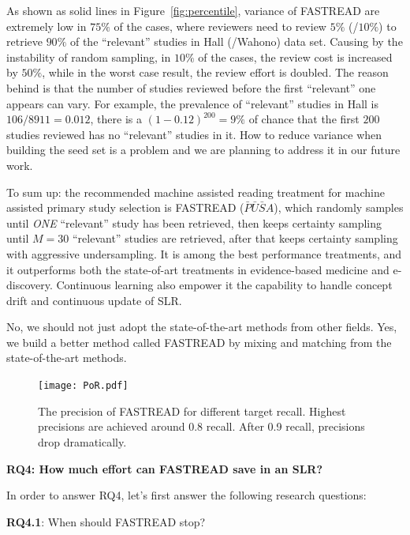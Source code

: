 \documentclass[final,twocolumn,5p]{elsarticle}
\theoremstyle{break}
\begin{document}
As shown as solid lines in Figure~\ref{fig:percentile}, variance of FASTREAD are extremely low in $75\%$ of the cases, where reviewers need to review $5\%$ (/$10\%$) to retrieve $90\%$ of the ``relevant'' studies in Hall (/Wahono) data set. Causing by the instability of random sampling, in $10\%$ of the cases, the review cost is increased by $50\%$, while in the worst case result, the review effort is doubled. The reason behind is that the number of studies reviewed before the first ``relevant'' one appears can vary. For example, the prevalence of ``relevant'' studies in Hall is $106/8911=0.012$, there is a $(1-0.12)^{200}=9\%$ of chance that the first $200$ studies reviewed has no ``relevant'' studies in it. How to reduce variance when building the seed set is a problem and we are planning to address it in our future work.

To sum up: the recommended machine assisted reading treatment for machine assisted primary study selection is FASTREAD ($\bar{P}\bar{U}\bar{S}A$), which randomly samples until {\em ONE}
``relevant'' study has been retrieved, then keeps certainty sampling until $M=30$ ``relevant'' studies are retrieved, after that keeps certainty sampling with aggressive undersampling. It is among the best performance treatments, and it outperforms both the state-of-art treatments in evidence-based medicine and e-discovery. Continuous learning also empower it the capability to handle concept drift and continuous update of SLR. 

\begin{lesson}
    No, we should not just adopt the state-of-the-art methods from other fields. Yes, we build a better method called FASTREAD by mixing and matching from the state-of-the-art methods.
\end{lesson}

\begin{figure}[th]
    \centering
    \texttt{[image: PoR.pdf]}
    \caption{The precision of FASTREAD for different target recall. Highest precisions are achieved around 0.8 recall. After 0.9 recall, precisions drop dramatically.}
    \label{fig:precision}
\end{figure}



\textbf{RQ4: How much effort can FASTREAD save in an SLR?}

In order to answer RQ4, let's first answer the following research questions:

\textbf{RQ4.1}: When should FASTREAD stop?
\end{document}
